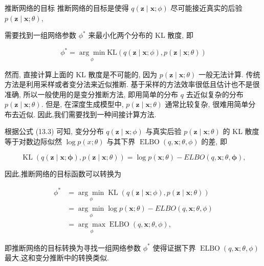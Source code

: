 \documentclass[10pt]{article}
\begin{document}
推断网络的目标 推断网络的目标是使得 $q(\boldsymbol{z} \mid \boldsymbol{x} ; \phi)$ 尽可能接近真实的后验 $p(\boldsymbol{z} \mid \boldsymbol{x} ; \theta)$,

需要找到一组网络参数 $\phi^{*}$ 来最小化两个分布的 KL 散度, 即


\begin{equation*}
\phi^{*}=\underset{\phi}{\arg \min } \mathrm{KL}(q(\boldsymbol{z} \mid \boldsymbol{x} ; \phi), p(\boldsymbol{z} \mid \boldsymbol{x} ; \theta)) \tag{13.11}
\end{equation*}


然而, 直接计算上面的 KL 散度是不可能的, 因为 $p(\boldsymbol{z} \mid \boldsymbol{x} ; \theta)$ 一般无法计算. 传统方法是利用采样或者变分法来近似推断. 基于采样的方法效率很低且估计也不是很准确, 所以一般使用的是变分推断方法, 即用简单的分布 $q$ 去近似复杂的分布 $p(\boldsymbol{z} \mid \boldsymbol{x} ; \theta)$. 但是, 在深度生成模型中, $p(\boldsymbol{z} \mid \boldsymbol{x} ; \theta)$ 通常比较复杂, 很难用简单分布去近似. 因此,我们需要找到一种间接计算方法.

根据公式 (13.3) 可知, 变分分布 $q(\boldsymbol{z} \mid \boldsymbol{x} ; \phi)$ 与真实后验 $p(\boldsymbol{z} \mid \boldsymbol{x} ; \theta)$ 的 KL 散度等于对数边际似然 $\log p(x ; \theta)$ 与其下界 $\operatorname{ELBO}(q, \boldsymbol{x} ; \theta, \phi)$ 的差, 即


\begin{equation*}
\operatorname{KL}(q(\boldsymbol{z} \mid \boldsymbol{x} ; \boldsymbol{\phi}), p(\boldsymbol{z} \mid \boldsymbol{x} ; \theta))=\log p(\boldsymbol{x} ; \theta)-E L B O(q, \boldsymbol{x} ; \theta, \boldsymbol{\phi}), \tag{13.12}
\end{equation*}


因此,推断网络的目标函数可以转换为


\begin{align*}
\phi^{*} & =\underset{\phi}{\arg \min } \operatorname{KL}(q(\boldsymbol{z} \mid \boldsymbol{x} ; \phi), p(\boldsymbol{z} \mid \boldsymbol{x} ; \theta))  \tag{13.13}\\
& =\underset{\phi}{\arg \min } \log p(\boldsymbol{x} ; \theta)-E L B O(q, \boldsymbol{x} ; \theta, \phi)  \tag{13.14}\\
& =\underset{\phi}{\arg \max } \operatorname{ELBO}(q, \boldsymbol{x} ; \theta, \phi), \tag{13.15}
\end{align*}


即推断网络的目标转换为寻找一组网络参数 $\phi^{*}$ 使得证据下界 $\operatorname{ELBO}(q, \boldsymbol{x} ; \theta, \phi)$最大,这和变分推断中的转换类似.
\end{document}
